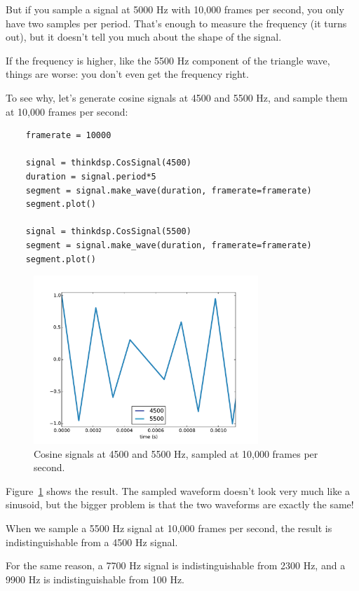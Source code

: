 \documentclass[12pt]{book}
\begin{document}
But if you sample a signal at 5000 Hz with 10,000 frames per second,
you only have two samples per period.  That's enough to measure the
frequency (it turns out), but it doesn't tell you much about
the shape of the signal.

If the frequency is higher, like the 5500 Hz component of the
triangle wave, things are worse: you don't even get the
frequency right.

To see why, let's generate cosine signals at 4500 and 5500 Hz,
and sample them at 10,000 frames per second:

\begin{verbatim}
    framerate = 10000

    signal = thinkdsp.CosSignal(4500)
    duration = signal.period*5
    segment = signal.make_wave(duration, framerate=framerate)
    segment.plot()

    signal = thinkdsp.CosSignal(5500)
    segment = signal.make_wave(duration, framerate=framerate)
    segment.plot()
\end{verbatim}

\begin{figure}
\centerline{\includegraphics[height=2.5in]{figs/aliasing-3.pdf}}
\caption{Cosine signals at 4500 and 5500 Hz, sampled at 10,000 frames
per second.}
\label{fig.aliasing-3}
\end{figure}

Figure~\ref{fig.aliasing-3} shows the result.  The
sampled waveform doesn't look very much like a sinusoid, but the
bigger problem is that the two waveforms are exactly the same!

When we sample a 5500 Hz signal at 10,000 frames per second, the
result is indistinguishable from a 4500 Hz signal.

For the same reason, a 7700 Hz signal is indistinguishable
from 2300 Hz, and a 9900 Hz is indistinguishable from 100 Hz.
\end{document}
